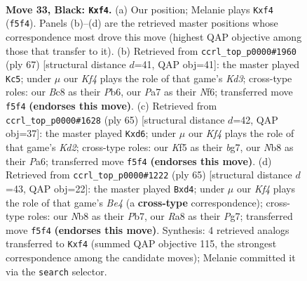 \documentclass[11pt]{article}
\begin{document}
\clearpage

\begin{figure}[p]\centering
\begin{subfigure}{0.46\textwidth}\centering
\resizebox{\linewidth}{!}{%
\newchessgame
\chessboard[
  setfen={rnb5/p5P1/2p1p3/P1PpNk2/1P3B2/2P5/5K2/R7 b - - 0 33},
  showmover=false,
  pgfstyle=straightmove, color=movearrow, markmove={f5-f4}
]}
\caption{}
\end{subfigure}\hfill
\begin{subfigure}{0.46\textwidth}\centering
\resizebox{\linewidth}{!}{%
\newchessgame
\chessboard[
  setfen={8/p6p/1p1kpnp1/4N3/4bP2/P5P1/1P5P/3B2K1 b - - 4 34},
  showmover=false,
  pgfstyle=straightmove, color=movearrow, markmove={d6-c5}
]}
\caption{}
\end{subfigure}
\\[4pt]
\begin{subfigure}{0.46\textwidth}\centering
\resizebox{\linewidth}{!}{%
\newchessgame
\chessboard[
  setfen={8/3k2Bp/p1pN4/1p2n1P1/7r/1P3b2/P1P5/2K1R3 b - - 0 33},
  showmover=false,
  pgfstyle=straightmove, color=movearrow, markmove={d7-d6}
]}
\caption{}
\end{subfigure}\hfill
\begin{subfigure}{0.46\textwidth}\centering
\resizebox{\linewidth}{!}{%
\newchessgame
\chessboard[
  setfen={8/1p3kp1/p4p2/4bN2/PnPBp3/1P6/3K1PP1/8 b - - 5 33},
  showmover=false,
  pgfstyle=straightmove, color=movearrow, markmove={e5-d4}
]}
\caption{}
\end{subfigure}
\caption{\textbf{Move 33, Black: \texttt{Kxf4}.} (a) Our position; Melanie plays \texttt{Kxf4} (\texttt{f5f4}). Panels (b)--(d) are the retrieved master positions whose correspondence most drove this move (highest QAP objective among those that transfer to it). (b) Retrieved from \texttt{ccrl\_top\_p0000\#1960} (ply 67) [structural distance $d$=41, QAP obj=41]: the master played \texttt{Kc5}; under $\mu$ our \emph{Kf4} plays the role of that game's \emph{Kd3}; cross-type roles: our \emph{B}c8 as their \emph{P}b6, our \emph{P}a7 as their \emph{N}f6; transferred move \texttt{f5f4} \textbf{(endorses this move)}. (c) Retrieved from \texttt{ccrl\_top\_p0000\#1628} (ply 65) [structural distance $d$=42, QAP obj=37]: the master played \texttt{Kxd6}; under $\mu$ our \emph{Kf4} plays the role of that game's \emph{Kd2}; cross-type roles: our \emph{K}f5 as their \emph{b}g7, our \emph{N}b8 as their \emph{P}a6; transferred move \texttt{f5f4} \textbf{(endorses this move)}. (d) Retrieved from \texttt{ccrl\_top\_p0000\#1222} (ply 65) [structural distance $d$=43, QAP obj=22]: the master played \texttt{Bxd4}; under $\mu$ our \emph{Kf4} plays the role of that game's \emph{Be4} (a \textbf{cross-type} correspondence); cross-type roles: our \emph{N}b8 as their \emph{P}b7, our \emph{R}a8 as their \emph{P}g7; transferred move \texttt{f5f4} \textbf{(endorses this move)}. Synthesis: 4 retrieved analogs transferred to \texttt{Kxf4} (summed QAP objective 115, the strongest correspondence among the candidate moves); Melanie committed it via the \texttt{search} selector.}
\label{fig:thought-m65}
\end{figure}
\end{document}

